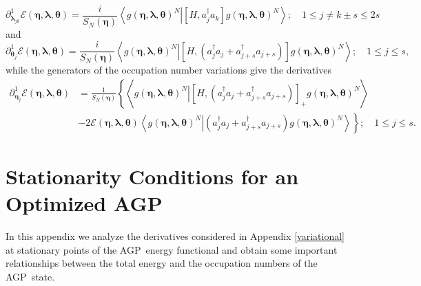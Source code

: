 \documentclass[titlepage]{article}%
\begin{document}
\begin{equation}
\partial_{\bm{\lambda}_{jk}}^{1}\mathcal{E}\left(
\bm{\eta },\bm{\lambda},\bm{\theta}\right)  =\frac{i}{S_{N}\left(
\bm{\eta}\right)  }\left\langle \left.  g\left(
\bm{\eta },\bm{\lambda},\bm{\theta}\right)  ^{N}\right\vert \left[
H,a_{j}^{\dagger}a_{k}\right]  g\left(
\bm{\eta},\bm{\lambda },\bm{\theta}\right)  ^{N}\right\rangle ;\quad1\leq
j\neq k\pm s\leq2s \label{Dlamda}%
\end{equation}
and
\begin{equation}
\partial_{\bm{\theta}_{j}}^{1}\mathcal{E}\left(
\bm{\eta },\bm{\lambda},\bm{\theta}\right)  =\frac{i}{S_{N}\left(
\bm{\eta}\right)  }\left\langle \left.  g\left(
\bm{\eta },\bm{\lambda},\bm{\theta}\right)  ^{N}\right\vert \left[  H,\left(
a_{j}^{\dagger}a_{j}+a_{j+s}^{\dagger}a_{j+s}\right)  \right]  g\left(
\bm{\eta},\bm{\lambda},\bm{\theta}\right)  ^{N}\right\rangle ;\quad1\leq j\leq
s, \label{Dtheta}%
\end{equation}
while the generators of the occupation number variations give the derivatives
\begin{align}
\partial_{\bm{\eta}_{j}}^{1}\mathcal{E}\left(
\bm{\eta},\bm{\lambda},\bm{\theta}\right)   &  =\frac{1}{S_{N}\left(
\bm{\eta}\right)  }\left\{  \left\langle \left.  g\left(
\bm{\eta },\bm{\lambda},\bm{\theta}\right)  ^{N}\right\vert \left[  H,\left(
a_{j}^{\dagger}a_{j}+a_{j+s}^{\dagger}a_{j+s}\right)  \right]  _{+}g\left(
\bm{\eta},\bm{\lambda},\bm{\theta}\right)  ^{N}\right\rangle \right.
\nonumber\\
&  -\left.  2\mathcal{E}\left(  \bm{\eta},\bm{\lambda},\bm{\theta }\right)
\left\langle \left.  g\left(  \bm{\eta},\bm{\lambda },\bm{\theta}\right)
^{N}\right\vert \left(  a_{j}^{\dagger}a_{j}+a_{j+s}^{\dagger}a_{j+s}\right)
g\left(  \bm{\eta},\bm{\lambda },\bm{\theta}\right)  ^{N}\right\rangle
\right\}  ;\quad1\leq j\leq s. \label{Deta}%
\end{align}


\section{Stationarity Conditions for an Optimized AGP\label{StatAGPCond}}

In this appendix we analyze the derivatives considered in Appendix
\ref{variational} at stationary points of the AGP\ energy functional and
obtain some important relationships between the total energy and the
occupation numbers of the AGP\ state.
\end{document}
